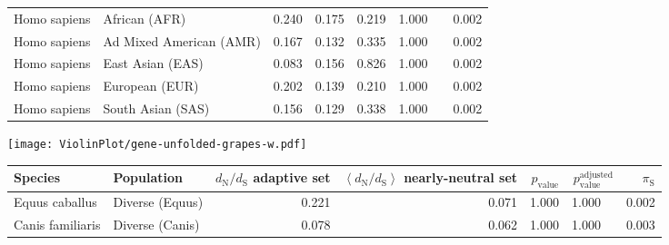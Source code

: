 \begin{center}
\begin{adjustbox}{width = 1\textwidth}
\begin{tabular}{|l|l|r|r|r|r|r|}
        Homo sapiens &                   African (AFR) &                                              0.240 &                                              0.175 &                0.219 &                                  1.000~~ &              0.002 \\
        Homo sapiens &         Ad Mixed American (AMR) &                                              0.167 &                                              0.132 &                0.335 &                                  1.000~~ &              0.002 \\
        Homo sapiens &                East Asian (EAS) &                                              0.083 &                                              0.156 &                0.826 &                                  1.000~~ &              0.002 \\
        Homo sapiens &                  European (EUR) &                                              0.202 &                                              0.139 &                0.210 &                                  1.000~~ &              0.002 \\
        Homo sapiens &               South Asian (SAS) &                                              0.156 &                                              0.129 &                0.338 &                                  1.000~~ &              0.002 \\
\bottomrule
\end{tabular}
\end{adjustbox}
\newpage
\texttt{[image: ViolinPlot/gene-unfolded-grapes-w.pdf]} 
\begin{adjustbox}{width = 1\textwidth}
\begin{tabular}{|l|l|r|r|r|r|r|}
\toprule
             Species &                      Population & \specialcell{$d_{\mathrm{N}} / d_{\mathrm{S}}$ \\ adaptive set} & \specialcell{$\left< d_{\mathrm{N}} / d_{\mathrm{S}} \right>$ \\ nearly-neutral set} & $p_{\mathrm{value}}$ & $p_{\mathrm{value}}^{\mathrm{adjusted}}$ & $\pi_{\textrm{S}}$ \\
\midrule
      Equus caballus &                 Diverse (Equus) &                                              0.221 &                                              0.071 &                1.000 &                                  1.000~~ &              0.002 \\
    Canis familiaris &                 Diverse (Canis) &                                              0.078 &                                              0.062 &                1.000 &                                  1.000~~ &              0.003 \\

\end{tabular}
\end{adjustbox}
\end{center}
